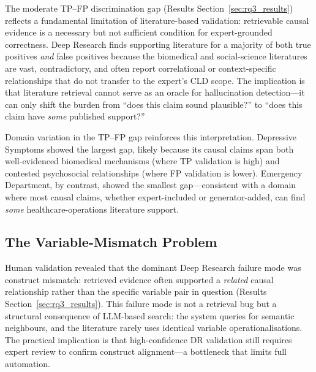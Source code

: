 The moderate TP--FP discrimination gap (Results Section~\ref{sec:rq3_results}) reflects a fundamental limitation of literature-based validation: retrievable causal evidence is a necessary but not sufficient condition for expert-grounded correctness. Deep Research finds supporting literature for a majority of both true positives \emph{and} false positives because the biomedical and social-science literatures are vast, contradictory, and often report correlational or context-specific relationships that do not transfer to the expert's CLD scope. The implication is that literature retrieval cannot serve as an oracle for hallucination detection---it can only shift the burden from ``does this claim sound plausible?'' to ``does this claim have \emph{some} published support?''

Domain variation in the TP--FP gap reinforces this interpretation. Depressive Symptoms showed the largest gap, likely because its causal claims span both well-evidenced biomedical mechanisms (where TP validation is high) and contested psychosocial relationships (where FP validation is lower). Emergency Department, by contrast, showed the smallest gap---consistent with a domain where most causal claims, whether expert-included or generator-added, can find \emph{some} healthcare-operations literature support.

\subsection{The Variable-Mismatch Problem}

Human validation revealed that the dominant Deep Research failure mode was construct mismatch: retrieved evidence often supported a \emph{related} causal relationship rather than the specific variable pair in question (Results Section~\ref{sec:rq3_results}). This failure mode is not a retrieval bug but a structural consequence of LLM-based search: the system queries for semantic neighbours, and the literature rarely uses identical variable operationalisations. The practical implication is that high-confidence DR validation still requires expert review to confirm construct alignment---a bottleneck that limits full automation.

